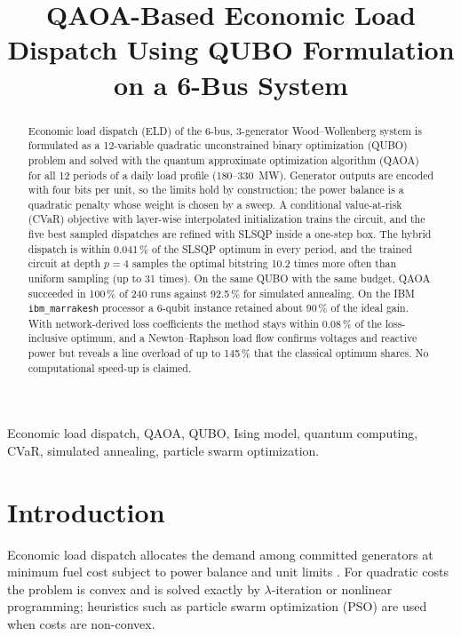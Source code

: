 \documentclass[conference]{IEEEtran}
\begin{document}
\title{QAOA-Based Economic Load Dispatch Using QUBO Formulation on a 6-Bus System}

\author{
}

\maketitle

\begin{abstract}
Economic load dispatch (ELD) of the 6-bus, 3-generator Wood--Wollenberg system is formulated as a 12-variable quadratic unconstrained binary optimization (QUBO) problem and solved with the quantum approximate optimization algorithm (QAOA) for all 12 periods of a daily load profile (180--330~MW). Generator outputs are encoded with four bits per unit, so the limits hold by construction; the power balance is a quadratic penalty whose weight is chosen by a sweep. A conditional value-at-risk (CVaR) objective with layer-wise interpolated initialization trains the circuit, and the five best sampled dispatches are refined with SLSQP inside a one-step box. The hybrid dispatch is within 0.041\,\% of the SLSQP optimum in every period, and the trained circuit at depth $p = 4$ samples the optimal bitstring 10.2 times more often than uniform sampling (up to 31 times). On the same QUBO with the same budget, QAOA succeeded in 100\,\% of 240 runs against 92.5\,\% for simulated annealing. On the IBM \texttt{ibm\_marrakesh} processor a 6-qubit instance retained about 90\,\% of the ideal gain. With network-derived loss coefficients the method stays within 0.08\,\% of the loss-inclusive optimum, and a Newton--Raphson load flow confirms voltages and reactive power but reveals a line overload of up to 145\,\% that the classical optimum shares. No computational speed-up is claimed.
\end{abstract}

\begin{IEEEkeywords}
Economic load dispatch, QAOA, QUBO, Ising model, quantum computing, CVaR, simulated annealing, particle swarm optimization.
\end{IEEEkeywords}

\section{Introduction}
Economic load dispatch allocates the demand among committed generators at minimum fuel cost subject to power balance and unit limits \cite{wood2014}. For quadratic costs the problem is convex and is solved exactly by $\lambda$-iteration or nonlinear programming; heuristics such as particle swarm optimization (PSO) \cite{gaing2003} are used when costs are non-convex.
\end{document}
